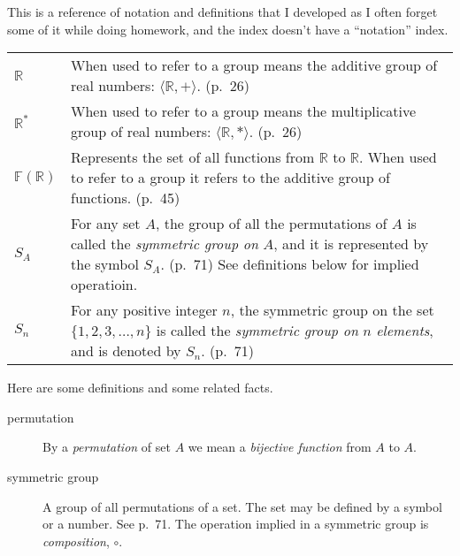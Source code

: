 \documentclass{amsart}
\newcommand{\Reals}{\ensuremath{\mathbb{R}}\xspace}
\begin{document}
This is a reference of notation and definitions that I developed as I
often forget some of it while doing homework, and the index doesn't
have a ``notation'' index.

\begin{tabular}{lp{4in}}
  $\Reals$ & When used to refer to a group means the additive group of
  real numbers: $\langle \Reals, + \rangle$. (p.~26) \\

  $\Reals^*$ & When used to refer to a group means the multiplicative
  group of real numbers: $\langle \Reals, * \rangle$. (p.~26) \\

  $\mathbb{F}(\Reals)$ & Represents the set of all functions from
  \Reals to \Reals. When used to refer to a group it refers to the
  additive group of functions. (p.~45) \\

  $S_A$ & For any set $A$, the group of all the permutations of $A$
  is called the \emph{symmetric group on} $A$, and it is represented
  by the symbol $S_A$. (p.~71) See definitions below for implied operatioin.\\

  $S_n$ & For any positive integer $n$, the symmetric group on the
  set $\{1, 2, 3, \ldots, n \}$ is called the \emph{symmetric group
    on} $n$ \emph{elements}, and is denoted by $S_n$. (p.~71) \\

\end{tabular}

Here are some definitions and some related facts.

\begin{description}
  \item[permutation] By a \emph{permutation} of set $A$ we mean a
    \emph{bijective function} from $A$ to $A$.

  \item[symmetric group] A group of all permutations of a set. The set
    may be defined by a symbol or a number. See p.~71. The operation
    implied in a symmetric group is \emph{composition}, $\circ$.
\end{description}
\end{document}

